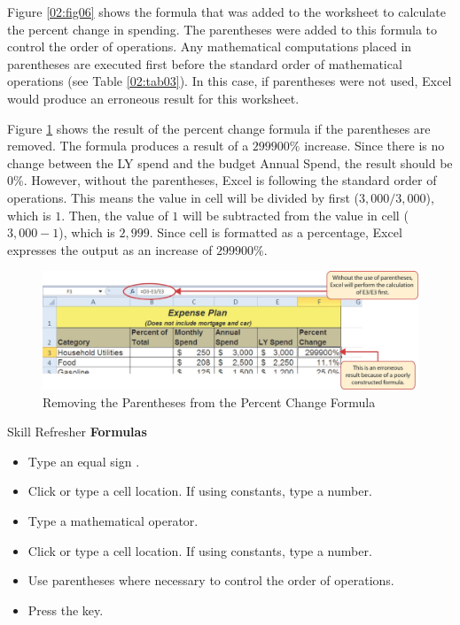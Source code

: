 Figure \ref{02:fig06} shows the formula that was added to the  worksheet to calculate the percent change in spending. The parentheses were added to this formula to control the order of operations. Any mathematical computations placed in parentheses are executed first before the standard order of mathematical operations (see Table \ref{02:tab03}). In this case, if parentheses were not used, Excel would produce an erroneous result for this worksheet.

Figure \ref{02:fig07} shows the result of the percent change formula if the parentheses are removed. The formula produces a result of a $ 299900\% $ increase. Since there is no change between the LY spend and the budget Annual Spend, the result should be 0\%. However, without the parentheses, Excel is following the standard order of operations. This means the value in cell  will be divided by  first ($ 3,000 / 3,000 $), which is $ 1 $. Then, the value of $ 1 $ will be subtracted from the value in cell  ($ 3,000 - 1 $), which is $ 2,999 $. Since cell  is formatted as a percentage, Excel expresses the output as an increase of $ 299900\% $.

\begin{figure}[H]
	\centering
	\includegraphics[width=\maxwidth{.95\linewidth}]{gfx/ch02_fig07}
	\caption{Removing the Parentheses from the Percent Change Formula}
	\label{02:fig07}
\end{figure}

\begin{center}
	\begin{sklbox}{Skill Refresher}
		\textbf{Formulas}
		\\
		\begin{itemize}
			\setlength{\itemsep}{0pt}
			\setlength{\parskip}{0pt}
			\setlength{\parsep}{0pt}
			
			\item Type an equal sign \fmtTyping{=}.
			\item Click or type a cell location. If using constants, type a number.
			\item Type a mathematical operator.
			\item Click or type a cell location. If using constants, type a number.
			\item Use parentheses where necessary to control the order of operations.
			\item Press the  key.

		\end{itemize}
	\end{sklbox}
\end{center}

